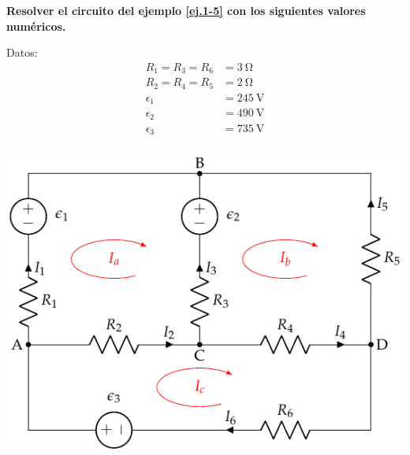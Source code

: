 	\begin{example}\label{ex.ejemplo_mallas}
          \textbf{Resolver el circuito del ejemplo \ref{ej.1-5} con
            los siguientes valores numéricos.}

          \begin{minipage}{0.35\linewidth}
            Datos:
            \begin{align*}
              R_1 = R_3 = R_6 &= \SI{3}{\ohm}\\
              R_2 = R_4 = R_5 &= \SI{2}{\ohm}\\
              \epsilon_1 &= \SI{245}{\volt}\\
              \epsilon_2 &= \SI{490}{\volt}\\
              \epsilon_3 &= \SI{735}{\volt}\\
            \end{align*}
          \end{minipage}
          \begin{minipage}{0.55\linewidth}
            \includegraphics{../figs/mallas1_corrientes.pdf}
          \end{minipage}


\end{example}

